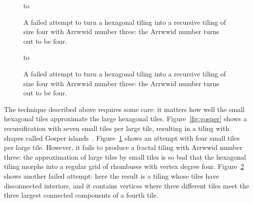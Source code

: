 \documentclass[11pt,a4paper]{article}
\begin{document}
\begin{figure}
\centering
\hbox to 
\caption{A failed attempt to turn a hexagonal tiling into a recursive tiling of size four with Arrwwid number three: the Arrwwid number turns out to be four.}
\label{fig:rhombus}
\end{figure}

\begin{figure}
\centering
\hbox to 
\caption{A failed attempt to turn a hexagonal tiling into a recursive tiling of size four with Arrwwid number three: the Arrwwid number turns out to be four.}
\label{fig:disconnected}
\end{figure}

The technique described above requires some care: it matters how well the small hexagonal tiles approximate the large hexagonal tiles. Figure~\ref{fig:gosper} shows a recursification with seven small tiles per large tile, resulting in a tiling with shapes called Gosper islands~\cite{Gardner1976}. Figure~\ref{fig:rhombus} shows an attempt with four small tiles per large tile. However, it fails to produce a fractal tiling with Arrwwid number three: the approximation of large tiles by small tiles is so bad that the hexagonal tiling morphs into a regular grid of rhombuses with vertex degree four. Figure~\ref{fig:disconnected} shows another failed attempt: here the result is a tiling whose tiles have disconnected interiors, and it contains vertices where three different tiles meet the three largest connected components of a fourth tile.
\end{document}
